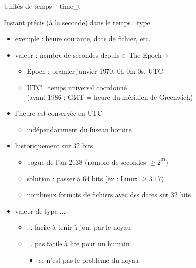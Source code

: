 \begin {frame} {Unités de temps -- time\_t}

    Instant précis (à la seconde) dans le temps : type 

    \begin {itemize}
	\item exemple : heure courante, date de fichier, etc.
	\item valeur : nombre de secondes depuis «~The Epoch~»
	    \begin {itemize}
		\item Epoch : premier janvier 1970, 0h 0m 0s, UTC
		\item UTC : temps universel coordonné
		    \\
		    {\fC (avant 1986 : GMT = heure du méridien de
		    Greenwich)}

	    \end {itemize}

	\item l'heure est conservée en UTC
	    \begin {itemize}
		\item indépendamment du fuseau horaire
	    \end {itemize}

	\item {} historiquement sur 32 bits
	    \begin {itemize}
		\item bogue de l'an 2038 (nombre de secondes $\geq 2^{31}$)
		\item solution : passer à 64 bits (ex : Linux $\geq 3.17$)
		\item nombreux formats de fichiers avec des dates
		    sur 32 bits
	    \end {itemize}

	\item valeur de type ...
	    \begin {itemize}
		\item ... facile à tenir à jour par le noyau
		\item ... pas facile à lire pour un humain
		    \begin {itemize}
			\item ce n'est pas le problème du noyau
		    \end {itemize}
	    \end {itemize}
    \end {itemize}
\end {frame}

